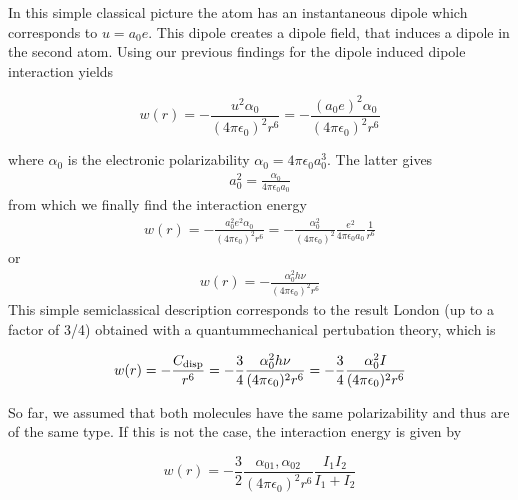 \documentclass[letterpaper,10pt,english]{sphinxmanual}
\begin{document}
\sphinxAtStartPar
In this simple classical picture the atom has an instantaneous dipole which corresponds to \(u=a_0 e\). This dipole creates a dipole field, that induces a dipole in the second atom. Using our previous findings for the dipole \sphinxhyphen{} induced dipole interaction yields

\sphinxAtStartPar
\begin{equation}
w(r)=-\frac{u^2 \alpha_0}{(4\pi \epsilon_0)^2 r^6}=-\frac{(a_0 e)^2 \alpha_0}{(4\pi \epsilon_0)^2 r^6}
\end{equation}

\sphinxAtStartPar
where \(\alpha_0\) is the electronic polarizability \(\alpha_0=4\pi \epsilon_0 a_0^3\). The latter gives
\begin{equation*}
\begin{split}a_0^{2}=\frac{\alpha_0}{4\pi \epsilon_0 a_0}\end{split}
\end{equation*}
\sphinxAtStartPar
from which we finally find the interaction energy
\begin{equation*}
\begin{split}w(r)=-\frac{a_0^2 e^2 \alpha_0}{(4\pi \epsilon_0)^2 r^6}=-\frac{\alpha_0^2}{(4\pi \epsilon_0)^2}\frac{e^2}{4\pi \epsilon_0 a_0 }\frac{1}{r^6}\end{split}
\end{equation*}
\sphinxAtStartPar
or
\begin{equation*}
\begin{split}w(r)=-\frac{\alpha_0^2 h\nu}{(4\pi \epsilon_0)^2 r^6}\end{split}
\end{equation*}
\sphinxAtStartPar
This simple semi\sphinxhyphen{}classical description corresponds to the result London (up to a factor of 3/4) obtained with a quantum\sphinxhyphen{}mechanical pertubation theory, which is

\sphinxAtStartPar
\begin{equation}
w(r)=-\frac{C_{\rm disp}}{r^6}=-\frac{3}{4}\frac{\alpha_0^2 h\nu}{(4\pi \epsilon_0)^2 r^6}=-\frac{3}{4}\frac{\alpha_0^2I}{(4\pi \epsilon_0)^2 r^6}
\end{equation}

\sphinxAtStartPar
So far, we assumed that both molecules have the same polarizability and thus are of the same type. If this is not the case, the interaction energy is given by

\sphinxAtStartPar
\begin{equation}
w(r)=-\frac{3}{2}\frac{\alpha_{01},\alpha_{02}}{(4\pi \epsilon_0)^2 r^6}\frac{I_1 I_2}{I_1+I_2}
\end{equation}
\end{document}
